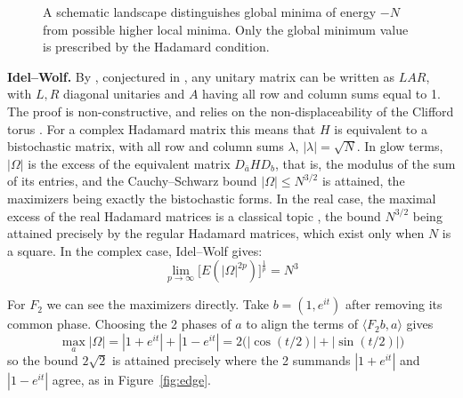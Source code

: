 \documentclass[11pt,a4paper]{article}
\theoremstyle{remark}
\begin{document}
\begin{figure}[htb!]
\centering
{}
\caption{A schematic landscape distinguishes global minima of energy $-N$ from possible higher local minima. Only the global minimum value is prescribed by the Hadamard condition.}\label{fig:landscape}
\end{figure}

\medskip
\noindent\textbf{Idel--Wolf.} By \cite{iwo}, conjectured in \cite{dvb}, any unitary matrix can be written as $LAR$, with $L,R$ diagonal unitaries and $A$ having all row and column sums equal to 1. The proof is non-constructive, and relies on the non-displaceability of the Clifford torus \cite{bep}. For a complex Hadamard matrix this means that $H$ is equivalent to a bistochastic matrix, with all row and column sums $\lambda$, $|\lambda|=\sqrt N$. In glow terms, $|\Omega|$ is the excess of the equivalent matrix $D_{\bar a}HD_b$, that is, the modulus of the sum of its entries, and the Cauchy--Schwarz bound $|\Omega|\leq N^{3/2}$ is attained, the maximizers being exactly the bistochastic forms. In the real case, the maximal excess of the real Hadamard matrices is a classical topic \cite{bes,fko,kha}, the bound $N^{3/2}$ being attained precisely by the regular Hadamard matrices, which exist only when $N$ is a square. In the complex case, Idel--Wolf gives:
$$\lim_{p\to\infty}\big[E(|\Omega|^{2p})\big]^{\frac1p}=N^3$$

For $F_2$ we can see the maximizers directly. Take $b=(1,e^{it})$ after
removing its common phase. Choosing the 2 phases of $a$ to align the
terms of $\langle F_2b,a\rangle$ gives
\[
 \max_a |\Omega|=|1+e^{it}|+|1-e^{it}|=2\big(|\cos(t/2)|+|\sin(t/2)|\big)
\]
so the bound $2\sqrt2$ is attained precisely where the 2 summands
$|1+e^{it}|$ and $|1-e^{it}|$ agree, as in Figure~\ref{fig:edge}.
\end{document}
